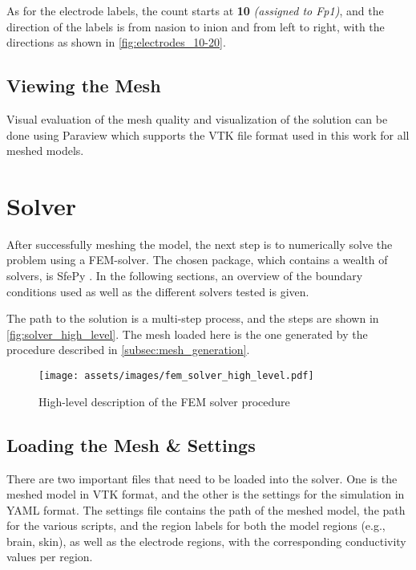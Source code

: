 As for the electrode labels, the count starts at \textbf{10} \textit{(assigned to Fp1)}, and the direction of the labels is from \gls{nasion} to \gls{inion} and from left to right, with the directions as shown in \autoref{fig:electrodes_10-20}.

\subsection{Viewing the Mesh}

Visual evaluation of the mesh quality and visualization of the solution can be done using Paraview \cite{paraview} which supports the \gls{VTK} file format used in this work for all meshed models.

\section{Solver}
\label{sec:fem_solver}

After successfully meshing the model, the next step is to numerically solve the problem using a \gls{FEM}-solver. The chosen package, which contains a wealth of solvers, is SfePy \cite{Cimrman2019}. In the following sections, an overview of the boundary conditions used as well as the different solvers tested is given.

The path to the solution is a multi-step process, and the steps are shown in \autoref{fig:solver_high_level}. The mesh loaded here is the one generated by the procedure described in \ref{subsec:mesh_generation}.

\begin{figure}[H]
    \centering
    \texttt{[image: assets/images/fem\_solver\_high\_level.pdf]}
    \caption{High-level description of the \gls{FEM} solver procedure}
    \label{fig:solver_high_level}
\end{figure}

\subsection{Loading the Mesh \& Settings}

There are two important files that need to be loaded into the solver. One is the meshed model in \gls{VTK} format, and the other is the settings for the simulation in \gls{YAML} format. The settings file contains the path of the meshed model, the path for the various scripts, and the region labels for both the model regions (e.g., brain, skin), as well as the electrode regions, with the corresponding conductivity values per region.

